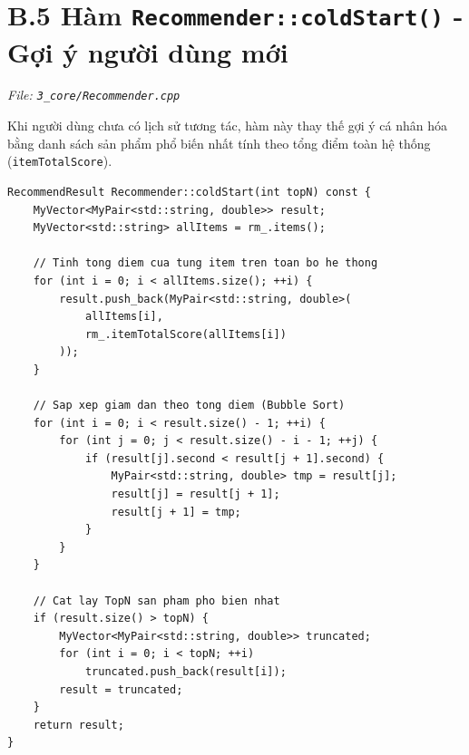 \documentclass{report}
\begin{document}
\section*{B.5 Hàm \texttt{Recommender::coldStart()} - Gợi ý người dùng mới}

\textit{File: \texttt{3\_core/Recommender.cpp}}

Khi người dùng chưa có lịch sử tương tác, hàm này thay thế gợi ý cá nhân hóa bằng danh sách sản phẩm phổ biến nhất tính theo tổng điểm toàn hệ thống (\texttt{itemTotalScore}).

\begin{lstlisting}[caption={Hàm coldStart() - File 3\_core/Recommender.cpp}, label={lst:cold_start}]
RecommendResult Recommender::coldStart(int topN) const {
    MyVector<MyPair<std::string, double>> result;
    MyVector<std::string> allItems = rm_.items();

    // Tinh tong diem cua tung item tren toan bo he thong
    for (int i = 0; i < allItems.size(); ++i) {
        result.push_back(MyPair<std::string, double>(
            allItems[i],
            rm_.itemTotalScore(allItems[i])
        ));
    }

    // Sap xep giam dan theo tong diem (Bubble Sort)
    for (int i = 0; i < result.size() - 1; ++i) {
        for (int j = 0; j < result.size() - i - 1; ++j) {
            if (result[j].second < result[j + 1].second) {
                MyPair<std::string, double> tmp = result[j];
                result[j] = result[j + 1];
                result[j + 1] = tmp;
            }
        }
    }

    // Cat lay TopN san pham pho bien nhat
    if (result.size() > topN) {
        MyVector<MyPair<std::string, double>> truncated;
        for (int i = 0; i < topN; ++i)
            truncated.push_back(result[i]);
        result = truncated;
    }
    return result;
}
\end{lstlisting}
\end{document}
